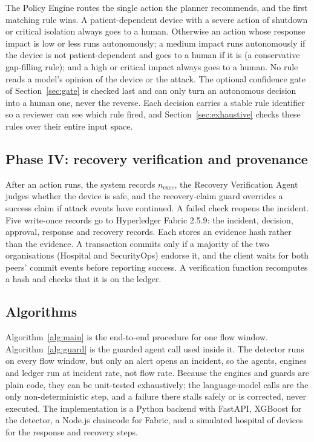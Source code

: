 \documentclass[preprint,12pt]{elsarticle}
\begin{document}
The Policy Engine routes the single action the planner recommends, and the first matching rule wins. A patient-dependent device with a severe action of shutdown or critical isolation always goes to a human. Otherwise an action whose response impact is low or less runs autonomously; a medium impact runs autonomously if the device is not patient-dependent and goes to a human if it is (a conservative gap-filling rule); and a high or critical impact always goes to a human. No rule reads a model's opinion of the device or the attack. The optional confidence gate of Section~\ref{sec:gate} is checked last and can only turn an autonomous decision into a human one, never the reverse. Each decision carries a stable rule identifier so a reviewer can see which rule fired, and Section~\ref{sec:exhaustive} checks these rules over their entire input space.

\subsection{Phase IV: recovery verification and provenance}
After an action runs, the system records $n_{\mathrm{exec}}$, the Recovery Verification Agent judges whether the device is safe, and the recovery-claim guard overrides a success claim if attack events have continued. A failed check reopens the incident. Five write-once records go to Hyperledger Fabric 2.5.9: the incident, decision, approval, response and recovery records. Each stores an evidence hash rather than the evidence. A transaction commits only if a majority of the two organisations (Hospital and SecurityOps) endorse it, and the client waits for both peers' commit events before reporting success. A verification function recomputes a hash and checks that it is on the ledger.

\subsection{Algorithms}
Algorithm~\ref{alg:main} is the end-to-end procedure for one flow window. Algorithm~\ref{alg:guard} is the guarded agent call used inside it. The detector runs on every flow window, but only an alert opens an incident, so the agents, engines and ledger run at incident rate, not flow rate. Because the engines and guards are plain code, they can be unit-tested exhaustively; the language-model calls are the only non-deterministic step, and a failure there stalls safely or is corrected, never executed. The implementation is a Python backend with FastAPI, XGBoost for the detector, a Node.js chaincode for Fabric, and a simulated hospital of devices for the response and recovery steps.
\end{document}
